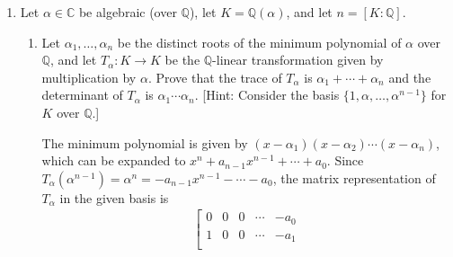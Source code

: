 \documentclass[12pt]{article}
\newcommand{\QQ}{\mathbb{Q}}
\newcommand{\CC}{\mathbb{C}}
\begin{document}
\begin{enumerate}
    \item
        Let $\alpha \in \CC$ be algebraic (over $\QQ$), let $K = \QQ(\alpha)$, and let $n = [K : \QQ]$.
        \begin{enumerate}
            \item
                Let $\alpha_1, \dots, \alpha_n$ be the distinct roots of the minimum polynomial of $\alpha$ over $\QQ$, and let $T_\alpha : K \rightarrow K$ be the $\QQ$-linear transformation given by multiplication by $\alpha$. Prove that the trace of $T_\alpha$ is $\alpha_1 + \cdots + \alpha_n$ and the determinant of $T_\alpha$ is $\alpha_1 \cdots \alpha_n$. [Hint: Consider the basis $\{1, \alpha, \dots, \alpha^{n-1}\}$ for $K$ over $\QQ$.] \par
                \iffalse
                    Following the hint, the matrix representation of $T_\alpha$ is
                    \begin{align*}
                        \left[ \begin{array}{ccccc}
                            0 & 0 & 0 & \cdots & -\alpha_1 \\
                            1 & 0 & 0 & \cdots & -\alpha_2 \\
                            0 & 1 & 0 & \cdots & -\alpha_3 \\
                            \vdots & \vdots & \ddots & \cdots & \vdots \\
                            0 & 0 & 0 & 1 & -\alpha_n
                        \end{array} \right]
                    \end{align*}
                    where the last column is deduced from the fact that $(\alpha - \alpha_1)(\alpha - \alpha_2)\cdots(\alpha - \alpha_n) = 0$ which implies $T_\alpha(\alpha^{n - 1}) = \alpha^n = -\alpha_1 - \alpha_2 \alpha + \cdots - \alpha_n \alpha^{n - 1}$.
                \fi
                The minimum polynomial is given by $(x - \alpha_1)(x - \alpha_2)\cdots(x - \alpha_n)$, which can be expanded to $x^n + a_{n - 1}x^{n - 1} + \cdots + a_0$. Since $T_\alpha(\alpha^{n - 1}) = \alpha^n = -a_{n - 1}x^{n - 1} - \cdots - a_0$, the matrix representation of $T_\alpha$ in the given basis is
                \begin{align*}
                    \left[ \begin{array}{ccccc}
                        0 & 0 & 0 & \cdots & -a_0 \\
                        1 & 0 & 0 & \cdots & -a_1 \\

\end{array}
\end{align*}
\end{enumerate}
\end{enumerate}
\end{document}
